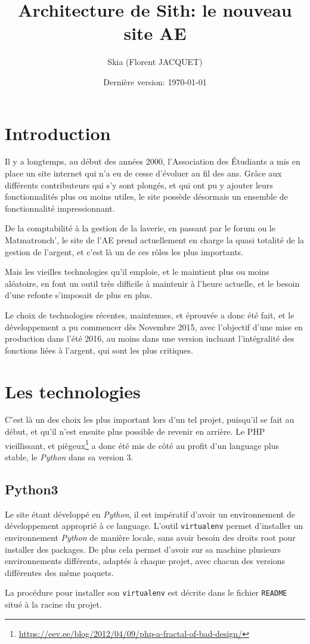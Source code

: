 \documentclass[a4paper]{report}
\title{Architecture de Sith: le nouveau site AE}
\author{Skia (Florent JACQUET)}
\date{Dernière version: \today}
\begin{document}
\maketitle

\tableofcontents

\chapter*{Introduction}
\par Il y a longtemps, au début des années 2000, l'Association des Étudiants a mis en place un site internet qui n'a eu de
cesse d'évoluer au fil des ans. Grâce aux différents contributeurs qui s'y sont plongés, et qui ont pu y ajouter leurs
fonctionnalités plus ou moins utiles, le site possède désormais un ensemble de fonctionnalité impressionnant.
\par De la comptabilité à la gestion de la laverie, en passant par le forum ou le Matmatronch', le site de l'AE prend
actuellement en charge la quasi totalité de la gestion de l'argent, et c'est là un de ces rôles les plus importants.
\par Mais les vieilles technologies qu'il emploie, et le maintient plus ou moins aléatoire, en font un outil très difficile à
maintenir à l'heure actuelle, et le besoin d'une refonte s'imposait de plus en plus.
\par Le choix de technologies récentes, maintenues, et éprouvée a donc été fait, et le développement a pu commencer dès
Novembre 2015, avec l'objectif d'une mise en production dans l'été 2016, au moins dans une version incluant
l'intégralité des fonctions liées à l'argent, qui sont les plus critiques.

\chapter{Les technologies}
\label{cha:les_technologies}
\par C'est là un des choix les plus important lors d'un tel projet, puisqu'il se fait au début, et qu'il n'est ensuite plus
possible de revenir en arrière. Le PHP vieillissant, et
piègeux\footnote{\url{https://eev.ee/blog/2012/04/09/php-a-fractal-of-bad-design/}} a donc été mis de côté au profit
d'un language plus stable, le \emph{Python} dans sa version 3.

\section{Python3}
\label{sec:python3}
\par Le site étant développé en \emph{Python}, il est impératif d'avoir un environnement de développement approprié à ce
language. L'outil \verb#virtualenv# permet d'installer un environnement \emph{Python} de manière locale, sans avoir besoin des
droits root pour installer des packages. De plus cela permet d'avoir sur sa machine plusieurs environnements différents,
adaptés à chaque projet, avec chacun des versions différentes des même paquets.
\par La procédure pour installer son \verb#virtualenv# est décrite dans le fichier \verb#README# situé à la racine du
projet.
\end{document}
